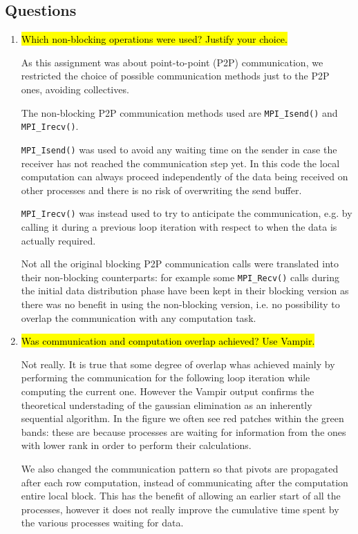 \subsection{Questions}
\begin{enumerate}
	\item \hl{Which non-blocking operations were used? Justify your choice.}

	As this assignment was about point-to-point (P2P) communication, we restricted the choice of possible communication methods just to the P2P ones, avoiding collectives.

	The non-blocking P2P communication methods used are \verb!MPI_Isend()! and \verb!MPI_Irecv()!.

	\verb!MPI_Isend()! was used to avoid any waiting time on the sender in case the receiver has not reached the communication step yet. In this code the local computation can always proceed independently of the data being received on other processes and there is no risk of overwriting the send buffer.

	\verb!MPI_Irecv()! was instead used to try to anticipate the communication, e.g. by calling it during a previous loop iteration with respect to when the data is actually required.

	Not all the original blocking P2P communication calls were translated into their non-blocking counterparts: for example some \verb!MPI_Recv()! calls during the initial data distribution phase have been kept in their blocking version as there was no benefit in using the non-blocking version, i.e. no possibility to overlap the communication with any computation task.

	\item \hl{Was communication and computation overlap achieved? Use Vampir.}

	Not really. It is true that some degree of overlap whas achieved mainly by performing the communication for the following loop iteration while computing the current one. However the Vampir output  confirms the theoretical understading of the gaussian elimination as an inherently sequential algorithm. In the figure  we often see red patches within the green bands: these are because processes are waiting for information from the ones with lower rank in order to perform their calculations.

	We also changed the communication pattern so that pivots are propagated after each row computation, instead of communicating after the computation entire local block. This has the benefit of allowing an earlier start of all the processes, however it does not really improve the cumulative time spent by the various processes waiting for data.


\end{enumerate}
